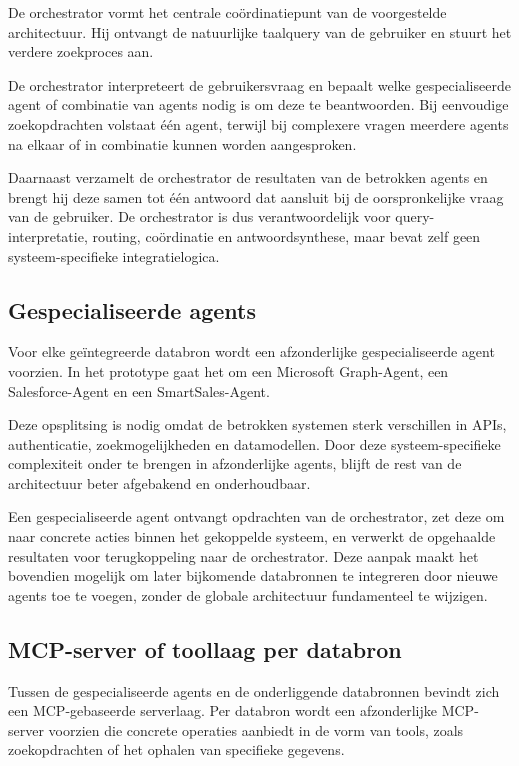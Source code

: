 De orchestrator vormt het centrale coördinatiepunt van de voorgestelde architectuur. Hij ontvangt de natuurlijke taalquery van de gebruiker en stuurt het verdere zoekproces aan.

De orchestrator interpreteert de gebruikersvraag en bepaalt welke gespecialiseerde agent of combinatie van agents nodig is om deze te beantwoorden. Bij eenvoudige zoekopdrachten volstaat één agent, terwijl bij complexere vragen meerdere agents na elkaar of in combinatie kunnen worden aangesproken.

Daarnaast verzamelt de orchestrator de resultaten van de betrokken agents en brengt hij deze samen tot één antwoord dat aansluit bij de oorspronkelijke vraag van de gebruiker. De orchestrator is dus verantwoordelijk voor query-interpretatie, routing, coördinatie en antwoordsynthese, maar bevat zelf geen systeem-specifieke integratielogica.

\subsection{Gespecialiseerde agents}
\label{subsec:gespecialiseerde-agents}

Voor elke geïntegreerde databron wordt een afzonderlijke gespecialiseerde agent voorzien. In het prototype gaat het om een Microsoft Graph-Agent, een Salesforce-Agent en een SmartSales-Agent.

Deze opsplitsing is nodig omdat de betrokken systemen sterk verschillen in \glspl{API}, authenticatie, zoekmogelijkheden en datamodellen. Door deze systeem-specifieke complexiteit onder te brengen in afzonderlijke agents, blijft de rest van de architectuur beter afgebakend en onderhoudbaar.

Een gespecialiseerde agent ontvangt opdrachten van de orchestrator, zet deze om naar concrete acties binnen het gekoppelde systeem, en verwerkt de opgehaalde resultaten voor terugkoppeling naar de orchestrator. Deze aanpak maakt het bovendien mogelijk om later bijkomende databronnen te integreren door nieuwe agents toe te voegen, zonder de globale architectuur fundamenteel te wijzigen.


\subsection{MCP-server of toollaag per databron}
\label{subsec:mcp-laag}

Tussen de gespecialiseerde agents en de onderliggende databronnen bevindt zich een \gls{MCP}-gebaseerde serverlaag. Per databron wordt een afzonderlijke \gls{MCP}-server voorzien die concrete operaties aanbiedt in de vorm van tools, zoals zoekopdrachten of het ophalen van specifieke gegevens.

